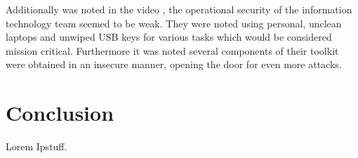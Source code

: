 \documentclass[a4paper, 11pt]{article} %
\begin{document}
Additionally was noted in the video \cite{halderman-estonia-presentation}, the operational security of the information technology team seemed to be weak. They were noted using personal, unclean laptops and unwiped USB keys for various tasks which would be considered mission critical. Furthermore it was noted several components of their toolkit were obtained in an insecure manner, opening the door for even more attacks.

\section*{Conclusion}
Lorem Ipstuff.







\end{document}
